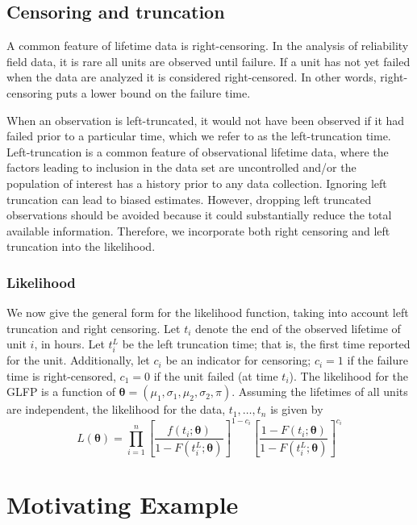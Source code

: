 \documentclass[12pt]{article}
\begin{document}
\subsection{Censoring and truncation}
A common feature of lifetime data is right-censoring. In the analysis of reliability field data, it is rare all units are observed until failure. If a unit has not yet failed when the data are analyzed it is considered right-censored.  In other words, right-censoring puts a lower bound on the failure time.


When an observation is left-truncated, it would not have been observed if it had failed prior to a particular time, which we refer to as the left-truncation time.  Left-truncation is a common feature of observational lifetime data, where the factors leading to inclusion in the data set are uncontrolled and/or the population of interest has a history prior to any data collection. Ignoring left truncation can lead to biased estimates. However, dropping left truncated observations should be avoided because it could substantially reduce the total available information.  Therefore, we incorporate both right censoring and left truncation into the likelihood. 


\subsubsection{Likelihood}
We now give the general form for the likelihood function, taking into account left truncation and right censoring.  Let $t_{i}$ denote the end of the observed lifetime of unit $i$, in hours.  Let $t_i^L$ be the left truncation time; that is, the first time reported for the unit.  Additionally, let $c_i$ be an indicator for censoring; $c_i=1$ if the failure time is right-censored, $c_1=0$ if the unit failed (at time $t_i$). The likelihood for the GLFP is a function of $\bm{\theta} = (\mu_1, \sigma_1, \mu_2, \sigma_2, \pi)$.  Assuming the lifetimes of all units are independent, the likelihood for the data, $t_1,\ldots,t_n$ is given by
\begin{equation*}
L(\bm{\theta})= \prod_{i=1}^{n} \left[\frac{f(t_i;\bm{\theta})}{1-F(t_i^L;\bm{\theta})}\right]^{1-c_i} \left[ \frac{1-F(t_i;\bm{\theta})}{1-F(t_i^L;\bm{\theta})} \right]^{c_i}
\end{equation*}

\section{Motivating Example}
\label{sec:Data}
\end{document}
